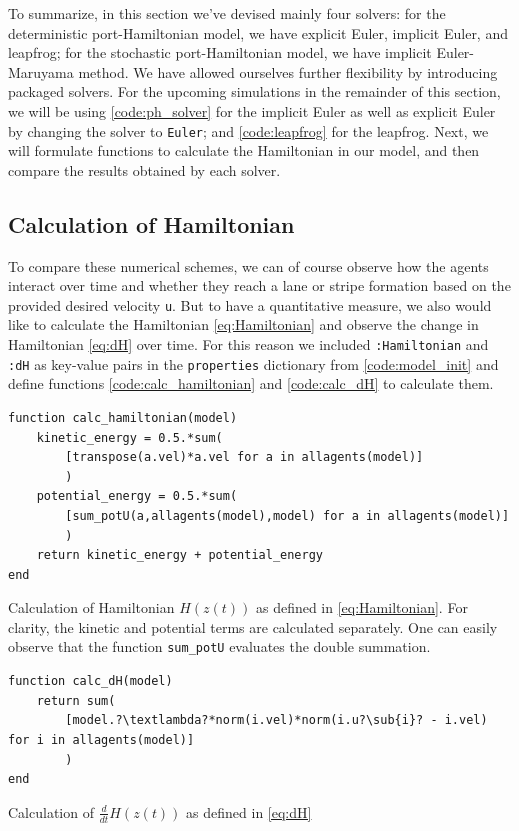 To summarize, in this section we've devised mainly four solvers: for the deterministic port-Hamiltonian model, we have explicit Euler, implicit Euler, and leapfrog; for the stochastic port-Hamiltonian model, we have implicit Euler-Maruyama method. We have allowed ourselves further flexibility by introducing packaged solvers. For the upcoming simulations in the remainder of this section, we will be using \autoref{code:ph_solver} for the implicit Euler as well as explicit Euler by changing the solver to \texttt{Euler}; and \autoref{code:leapfrog} for the leapfrog. Next, we will formulate functions to calculate the Hamiltonian in our model, and then compare the results obtained by each solver.

\subsection{Calculation of Hamiltonian}
\label{section:calc_ham}

To compare these numerical schemes, we can of course observe how the agents interact over time and whether they reach a lane or stripe formation based on the provided desired velocity \texttt{u}. But to have a quantitative measure, we also would like to calculate the Hamiltonian \autoref{eq:Hamiltonian} and observe the change in Hamiltonian \autoref{eq:dH} over time. For this reason we included \texttt{:Hamiltonian} and \texttt{:dH} as key-value pairs in the \texttt{properties} dictionary from \autoref{code:model_init} and define functions \autoref{code:calc_hamiltonian} and \autoref{code:calc_dH} to calculate them.

\begin{listing}[H]
\begin{verbatim}    
function calc_hamiltonian(model)
    kinetic_energy = 0.5.*sum(
        [transpose(a.vel)*a.vel for a in allagents(model)]
        )
    potential_energy = 0.5.*sum(
        [sum_potU(a,allagents(model),model) for a in allagents(model)]
        )
    return kinetic_energy + potential_energy
end
\end{verbatim}
\caption{Calculation of Hamiltonian $H(z(t))$ as defined in \autoref{eq:Hamiltonian}. For clarity, the kinetic and potential terms are calculated separately. One can easily observe that the function \texttt{sum\_potU} evaluates the double summation.}
\label{code:calc_hamiltonian}
\end{listing}

\begin{listing}[H]
\begin{verbatim}    
function calc_dH(model)
    return sum(
        [model.?\textlambda?*norm(i.vel)*norm(i.u?\sub{i}? - i.vel) for i in allagents(model)]
        )
end
\end{verbatim}
\caption{Calculation of $\frac{d}{dt}H(z(t))$ as defined in \autoref{eq:dH}}
\label{code:calc_dH}
\end{listing}

